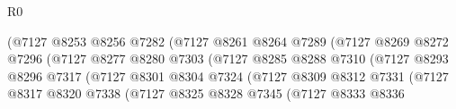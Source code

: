 \begin{lexlean}{R0}
\begin{coremodule}
                                            (@7127
                                              @8253
                                              @8256
                                              @7282
                                              (@7127
                                                @8261
                                                @8264
                                                @7289
                                                (@7127
                                                  @8269
                                                  @8272
                                                  @7296
                                                  (@7127
                                                    @8277
                                                    @8280
                                                    @7303
                                                    (@7127
                                                      @8285
                                                      @8288
                                                      @7310
                                                      (@7127
                                                        @8293
                                                        @8296
                                                        @7317
                                                        (@7127
                                                          @8301
                                                          @8304
                                                          @7324
                                                          (@7127
                                                            @8309
                                                            @8312
                                                            @7331
                                                            (@7127
                                                              @8317
                                                              @8320
                                                              @7338
                                                              (@7127
                                                                @8325
                                                                @8328
                                                                @7345
                                                                (@7127
                                                                  @8333
                                                                  @8336

\end{coremodule}
\end{lexlean}
